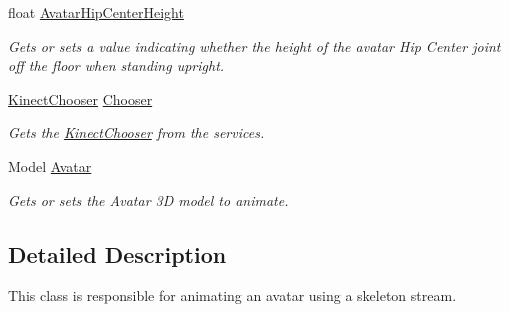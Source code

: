 \begin{DoxyCompactItemize}
float \hyperlink{class_microsoft_1_1_samples_1_1_kinect_1_1_avateering_1_1_avatar_animator_a0af976059d0d5692d70c7fa6e35c1bd7}{Avatar\+Hip\+Center\+Height}
\begin{DoxyCompactList}\small\item\em Gets or sets a value indicating whether the height of the avatar Hip Center joint off the floor when standing upright. \end{DoxyCompactList}\item 
\hyperlink{class_microsoft_1_1_samples_1_1_kinect_1_1_avateering_1_1_kinect_chooser}{Kinect\+Chooser} \hyperlink{class_microsoft_1_1_samples_1_1_kinect_1_1_avateering_1_1_avatar_animator_a80c63506559b26d0850796c9563fd449}{Chooser}
\begin{DoxyCompactList}\small\item\em Gets the \hyperlink{class_microsoft_1_1_samples_1_1_kinect_1_1_avateering_1_1_kinect_chooser}{Kinect\+Chooser} from the services. \end{DoxyCompactList}\item 
Model \hyperlink{class_microsoft_1_1_samples_1_1_kinect_1_1_avateering_1_1_avatar_animator_a6387822c328c988fe91ce1dacff089b8}{Avatar}
\begin{DoxyCompactList}\small\item\em Gets or sets the Avatar 3\+D model to animate. \end{DoxyCompactList}\end{DoxyCompactItemize}


\subsection{Detailed Description}
This class is responsible for animating an avatar using a skeleton stream. 



